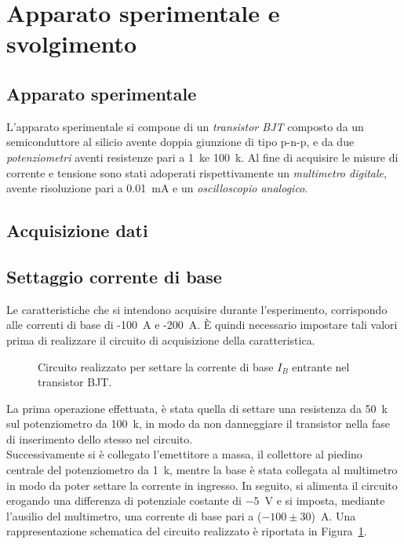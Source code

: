 \documentclass[../main.tex]{subfiles}
\begin{document}
    \section{Apparato sperimentale e svolgimento} \label{sec:acquisizione}

    \subsection{Apparato sperimentale}\label{subsec:apparato-sperimentale}

    L'apparato sperimentale si compone di un \textit{transistor BJT} composto da un
    semiconduttore al silicio avente doppia giunzione di tipo p-n-p, e da due
    \textit{potenziometri} aventi resistenze pari a 1~k\textohm\;e 100~k\textohm.
    Al fine di acquisire le misure di corrente e tensione sono stati adoperati
    rispettivamente un \textit{multimetro digitale}, avente risoluzione pari a
    0.01~mA e un \textit{oscilloscopio analogico}.

    \subsection{Acquisizione dati}\label{subsec:acquisizione-dati}
    \vspace{0.2cm}
    \subsection*{Settaggio corrente di base}

    Le caratteristiche che si intendono acquisire durante l'esperimento,
    corrispondo alle correnti di base di -100~\textmu A e -200~\textmu A.
    È quindi necessario impostare tali valori prima di realizzare il circuito
    di acquisizione della caratteristica.

    \begin{figure}[h!]
        \centering
        
        \caption{Circuito realizzato per settare la corrente di base $I_B$ entrante nel transistor BJT.}
        \label{fig:circuito-corrente-base}
    \end{figure}

    \noindent La prima operazione effettuata, è stata quella di settare
    una resistenza da 50~k\textohm\; sul potenziometro da 100~k\textohm,
    in modo da non danneggiare il transistor nella fase di inserimento dello stesso nel circuito. \\
    Successivamente si è collegato l'emettitore a massa, il collettore al piedino centrale
    del potenziometro da 1~k\textohm, mentre la base è stata collegata al multimetro
    in modo da poter settare la corrente in ingresso.
    In seguito, si alimenta il circuito erogando una differenza di potenziale
    costante di $-5$~V e si imposta, mediante l'ausilio del multimetro,
    una corrente di base pari a ($-100 \pm 30$)~\textmu A.
    Una rappresentazione schematica del circuito realizzato è riportata
    in Figura~\ref{fig:circuito-corrente-base}.
\end{document}
